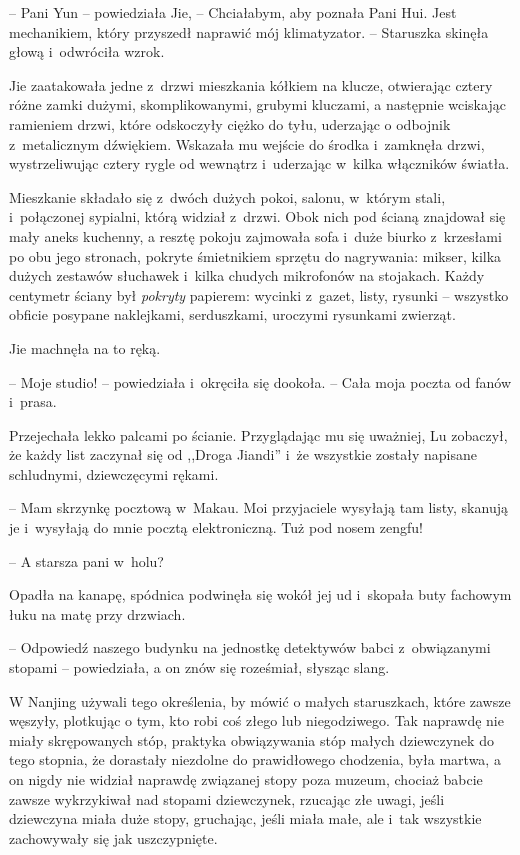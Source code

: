 \documentclass[oneside,polish,11pt,rmheadings]{mwbk}
\begin{document}
-- Pani Yun -- powiedziała Jie, -- Chciałabym, aby poznała Pani Hui. Jest mechanikiem, który przyszedł naprawić mój klimatyzator. -- Staruszka skinęła głową i~odwróciła wzrok.

Jie zaatakowała jedne z~drzwi mieszkania kółkiem na klucze, otwierając cztery różne zamki dużymi, skomplikowanymi, grubymi kluczami, a następnie wciskając ramieniem drzwi, które odskoczyły ciężko do tyłu, uderzając o odbojnik z~metalicznym dźwiękiem. Wskazała mu wejście do środka i~zamknęła drzwi, wystrzeliwując cztery rygle od wewnątrz i~uderzając w~kilka włączników światła.

Mieszkanie składało się z~dwóch dużych pokoi, salonu, w~którym stali, i~połączonej sypialni, którą widział z~drzwi. Obok nich pod ścianą znajdował się mały aneks kuchenny, a resztę pokoju zajmowała sofa i~duże biurko z~krzesłami po obu jego stronach, pokryte śmietnikiem sprzętu do nagrywania: mikser, kilka dużych zestawów słuchawek i~kilka chudych mikrofonów na stojakach. Każdy centymetr ściany był \textit{pokryty }papierem: wycinki z~gazet, listy, rysunki -- wszystko obficie posypane naklejkami, serduszkami, uroczymi rysunkami zwierząt.

Jie machnęła na to ręką. 

-- Moje studio! -- powiedziała i~okręciła się dookoła. -- Cała moja poczta od fanów i~prasa. 

 Przejechała lekko palcami po ścianie. Przyglądając mu się uważniej, Lu zobaczył, że każdy list zaczynał się od ,,Droga Jiandi'' i~że wszystkie zostały napisane schludnymi, dziewczęcymi rękami. 
 
 -- Mam skrzynkę pocztową w~Makau. Moi przyjaciele wysyłają tam listy, skanują je i~wysyłają do mnie pocztą elektroniczną. Tuż pod nosem zengfu! 

-- A starsza pani w~holu?

Opadła na kanapę, spódnica podwinęła się wokół jej ud i~skopała buty fachowym łuku na matę przy drzwiach. 

-- Odpowiedź naszego budynku na jednostkę detektywów babci z~obwiązanymi stopami -- powiedziała, a on znów się roześmiał, słysząc slang. 

W Nanjing używali tego określenia, by mówić o małych staruszkach, które zawsze węszyły, plotkując o tym, kto robi coś złego lub niegodziwego. Tak naprawdę nie miały skrępowanych stóp, praktyka obwiązywania stóp małych dziewczynek do tego stopnia, że dorastały niezdolne do prawidłowego chodzenia, była martwa, a on nigdy nie widział naprawdę związanej stopy poza muzeum, chociaż babcie zawsze wykrzykiwał nad stopami dziewczynek, rzucając złe uwagi, jeśli dziewczyna miała duże stopy, gruchając, jeśli miała małe, ale i~tak wszystkie zachowywały się jak uszczypnięte.
\end{document}
